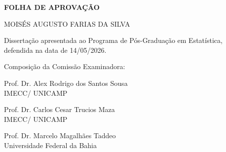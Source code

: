 \documentclass[
  oldfontcommands,
  sumario=tradicional,
  12pt,      %
  openright,    %
  oneside,    %
  a4paper,    %
  english,    %
  brazilian      %
]{imecc-unicamp}
\begin{document}
\begin{fichacatalografica}
  
\end{fichacatalografica}
\begin{folhadeaprovacao}
  \begin{center}
    {\ABNTEXchapterfont\large\bfseries FOLHA DE APROVAÇÃO}
  \end{center}

  \vspace{2cm}

  \begin{center}
    MOISÉS AUGUSTO FARIAS DA SILVA
  \end{center}

  \vspace{1.5cm}

  Dissertação apresentada ao Programa de Pós-Graduação em Estatística,
  defendida na data de 14/05/2026.

  \vspace{2cm}

  Composição da Comissão Examinadora:

  \vspace{1.5cm}

  Prof. Dr. Alex Rodrigo dos Santos Sousa\\
  IMECC/ UNICAMP

  \vspace{1.5cm}

  Prof. Dr. Carlos Cesar Trucios Maza\\
  IMECC/ UNICAMP

  \vspace{1.5cm}

  Prof. Dr. Marcelo Magalhães Taddeo\\
  Universidade Federal da Bahia
\end{folhadeaprovacao}
\end{document}
